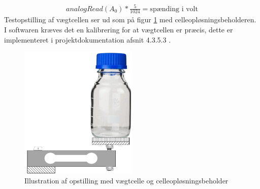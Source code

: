  \begin{align}
 analogRead(A_0)*\frac{5}{1024}=\text{spænding i volt}
 \label{eq:trintilvolt}
 \end{align}
Testopstilling af vægtcellen ser ud som på figur \ref{fig:loadcell_mont} med celleopløsningsbeholderen. I softwaren kræves det en kalibrering for at vægtcellen er præcis, dette er implementeret i projektdokumentation afsnit 4.3.5.3 .
 
 \begin{figure}[H]
	\centering
	\includegraphics[width=0.5\textwidth]{billeder/Hardware/diagrammer/loadcell_montering.pdf}
	\caption{Illustration af opstilling med vægtcelle og celleopløsningsbeholder}
	\label{fig:loadcell_mont}
\end{figure}

